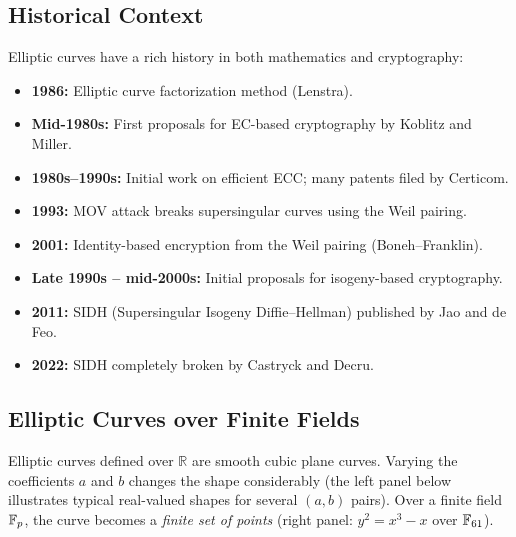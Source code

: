 \documentclass[11pt]{article}
\begin{document}
\subsection{Historical Context}

Elliptic curves have a rich history in both mathematics and cryptography:
\begin{itemize}
  \item \textbf{1986:} Elliptic curve factorization method (Lenstra).
  \item \textbf{Mid-1980s:} First proposals for EC-based cryptography by
    Koblitz and Miller.
  \item \textbf{1980s--1990s:} Initial work on efficient ECC; many patents
    filed by Certicom.
  \item \textbf{1993:} MOV attack breaks supersingular curves using the
    Weil pairing.
  \item \textbf{2001:} Identity-based encryption from the Weil pairing
    (Boneh--Franklin).
  \item \textbf{Late 1990s -- mid-2000s:} Initial proposals for
    isogeny-based cryptography.
  \item \textbf{2011:} SIDH (Supersingular Isogeny Diffie--Hellman)
    published by Jao and de Feo.
  \item \textbf{2022:} SIDH completely broken by Castryck and Decru.
\end{itemize}

\subsection{Elliptic Curves over Finite Fields}

Elliptic curves defined over $\mathbb{R}$ are smooth cubic plane curves.
Varying the coefficients $a$ and $b$ changes the shape considerably (the
left panel below illustrates typical real-valued shapes for several $(a,b)$
pairs).  Over a finite field $\mathbb{F}_p$, the curve becomes a \emph{finite set
of points} (right panel: $y^2 = x^3 - x$ over $\mathbb{F}_{61}$).
\end{document}
